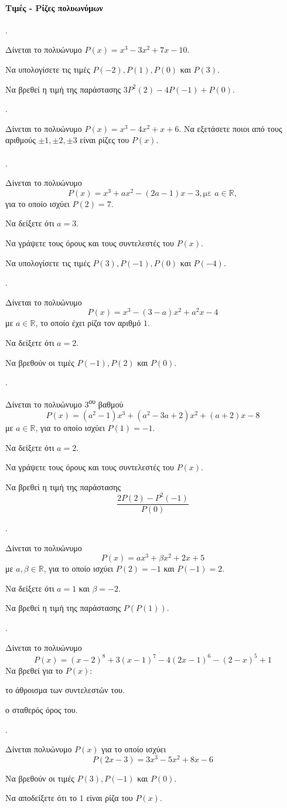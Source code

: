 \documentclass[11pt,a4paper,twocolumn]{article}
\newcounter{askhsh}
\newcommand{\askhsh}{\large\theaskhsh.\ \addtocounter{askhsh}{1}}
\newcommand{\tss}[1]{\textsuperscript{#1}}
\begin{document}
\paragraph{Τιμές - Ρίζες πολυωνύμων}
\askhsh Δίνεται το πολυώνυμο $P(x)=x^3-3x^2+7x-10$.
\begin{alist}
\item Να υπολογίσετε τις τιμές $P(-2),P(1),P(0)$ και $P(3)$.
\item Να βρεθεί η τιμή της παράστασης $3P^2(2)-4P(-1)+P(0)$.
\end{alist}
\askhsh Δίνεται το πολυώνυμο $P(x)=x^3-4x^2+x+6$. Να εξετάσετε ποιοι από τους αριθμούς $\pm1,\pm2,\pm3$ είναι ρίζες του $P(x)$.\\\\
\askhsh Δίνεται το πολυώνυμο \[P(x)=x^3+ax^2-(2a-1)x-3, \text{με }a\in\mathbb{R},\] για το οποίο ισχύει $P(2)=7$.
\begin{alist}
\item Να δείξετε ότι $a=3$.
\item Να γράψετε τους όρους και τους συντελεστές του $P(x)$.
\item Να υπολογίσετε τις τιμές $P(3),P(-1),P(0)$ και $P(-4)$.
\end{alist}
\askhsh Δίνεται το πολυώνυμο 
\[ P(x)=x^3-(3-a)x^2+a^2x-4 \]
με $a\in\mathbb{R}$, το οποίο έχει ρίζα τον αριθμό $1$.
\begin{alist}
\item Να δείξετε ότι $a=2$.
\item Να βρεθούν οι τιμές $P(-1),P(2)$ και $P(0)$.
\end{alist}
\askhsh Δίνεται το πολυώνυμο 3\tss{ου} βαθμού
\[ P(x)=(a^2-1)x^3+\left(a^2-3a+2\right)x^2+(a+2)x-8 \]
με $a\in\mathbb{R}$, για το οποίο ισχύει $P(1)=-1$.
\begin{alist}
\item  Να δείξετε ότι $a=2$.
\item  Να γράψετε τους όρους και τους συντελεστές του $P(x)$.
\item Να βρεθεί η τιμή της παράστασης \[\dfrac{2P(2)-P^2(-1)}{P(0)}\]
\end{alist}
\askhsh Δίνεται το πολυώνυμο \[P(x)=ax^3+\beta x^2+2x+5\]
με $a,\beta\in\mathbb{R}$, για το οποίο ισχύει $P(2)=-1$ και $P(-1)=2$.
\begin{alist}
\item Να δείξετε ότι $a=1$ και $\beta=-2$.
\item Να βρεθεί η τιμή της παράστασης $ P(P(1)) $.
\end{alist}
\askhsh Δίνεται το πολυώνυμο
\[ P(x)=(x-2)^{8}+3(x-1)^7-4(2x-1)^6-(2-x)^5+1 \]
Να βρεθεί για το $P(x)$:
\begin{alist}
\item το άθροισμα των συντελεστών του.
\item ο σταθερός όρος του.
\end{alist}
\askhsh Δίνεται πολυώνυμο $P(x)$ για το οποίο ισχύει
\[ P(2x-3)=3x^3-5x^2+8x-6 \]
\begin{alist}
\item Να βρεθούν οι τιμές $P(3),P(-1)$ και $P(0)$.
\item Να αποδείξετε ότι το $ 1 $ είναι ρίζα του $P(x)$.
\end{alist}
\end{document}
